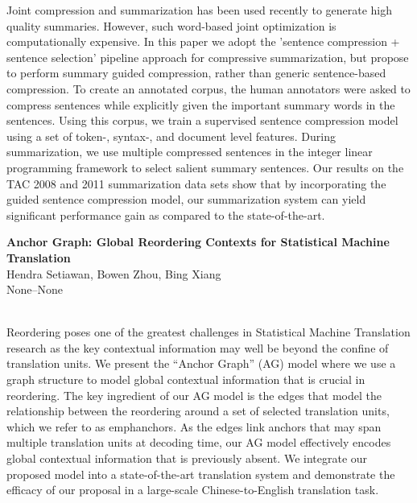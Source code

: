 \documentclass[twoside,makeidx]{book}
\renewcommand{\normalsize}{\fontsize{8}{9}\selectfont}
\renewcommand{\small}{\fontsize{7}{8}\selectfont}
\begin{document}
\nopagebreak%
\noindent%
{\small Joint compression and summarization has been used recently to generate high quality summaries. However, such word-based joint optimization is computationally expensive. In this paper we adopt the 'sentence compression + sentence selection' pipeline approach for compressive summarization, but propose to perform summary guided compression, rather than generic sentence-based compression. To create an annotated corpus, the human annotators were asked to compress sentences while explicitly given the important summary words in the sentences. Using this corpus, we train a supervised sentence compression model using a set of token-, syntax-, and document level features. During summarization, we use multiple compressed sentences in the integer linear programming framework to select salient summary sentences. Our results on the TAC 2008 and 2011 summarization data sets show that by incorporating the guided sentence compression model, our summarization system can yield significant performance gain as compared to the state-of-the-art.}
\par\vspace{2em}\noindent%
\begin{minipage}{\linewidth}%
\begin{center}
\textbf{\normalsize Anchor Graph: Global Reordering Contexts for Statistical Machine Translation}\\
\normalsize  Hendra Setiawan,  Bowen Zhou,  Bing Xiang\\
{\small None--None}\\
\end{center}
\end{minipage}\\[0.5em]
\nopagebreak%
\noindent%
{\small Reordering poses one of the greatest challenges in Statistical Machine Translation research as the key contextual information may well be beyond the confine of translation units. We present the ``Anchor Graph'' (AG) model where we use a graph structure to model global contextual information that is crucial in reordering. The key ingredient of our AG model is the edges that model the relationship between the reordering around a set of selected translation units, which we refer to as  emph{anchors}. As the edges link anchors that may span multiple translation units at decoding time, our AG model effectively encodes global contextual information that is previously absent. We integrate our proposed model into a state-of-the-art translation system and demonstrate the efficacy of our proposal in a large-scale Chinese-to-English translation task.}
\end{document}
